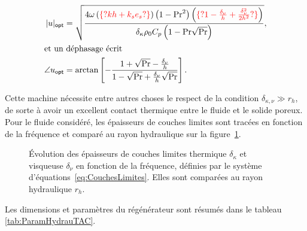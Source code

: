 \begin{subequations}
	\begin{align}
		|u|_{\sf opt} &= \sqrt{\frac{4\omega\left(\textcolor{red}{\{?kh+k_se_s?\}}\right)\left(1-\mathrm{Pr}^2\right)\left(\textcolor{red}{\{?1-\frac{\delta_\nu}{h}+\frac{\delta_\nu^2}{2h^2}?\}}\right)}{\delta_\kappa \rho_0 C_p \left(1-\mathrm{Pr}\sqrt{\mathrm{Pr}}\right)}},	\label{eq:u_mag_opt_Gaelle}\\
		\intertext{et un déphasage écrit}
		\angle u_{\sf opt} &= \arctan\left[-\frac{1+\sqrt{\mathrm{Pr}}-\frac{\delta_\nu}{h}}{1-\sqrt{\mathrm{Pr}}+\frac{\delta_\nu}{h}\sqrt{\mathrm{Pr}}}\right].	\label{eq:u_arg_opt_Gaelle}
	\end{align}
	\label{eq:u_opt_Gaelle}
\end{subequations}

Cette machine nécessite entre autres choses le respect de la condition $\delta_{\kappa,\nu} \gg r_h$, de sorte à avoir un excellent contact thermique entre le fluide et le solide poreux. Pour le fluide considéré, les épaisseurs de couches limites sont tracées en fonction de la fréquence et comparé au rayon hydraulique sur la figure~\ref{fig:dKdV}.

\begin{figure}[!ht]
    \centering
    
    \caption{\'Evolution des épaisseurs de couches limites thermique $\delta_\kappa$ et visqueuse $\delta_\nu$ en fonction de la fréquence, définies par le système d'équations~\eqref{eq:CouchesLimites}. Elles sont comparées au rayon hydraulique $r_h$.}
    \label{fig:dKdV}
\end{figure}

Les dimensions et paramètres du régénérateur sont résumés dans le tableau \ref{tab:ParamHydrauTAC}.

